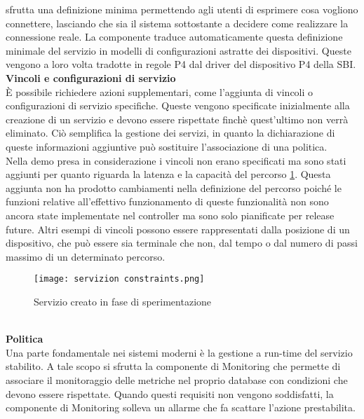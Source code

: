 sfrutta una definizione minima permettendo agli utenti di esprimere cosa vogliono connettere, lasciando che sia il sistema sottostante a decidere come realizzare la connessione reale.
La componente traduce automaticamente questa definizione minimale del servizio in modelli di configurazioni astratte dei dispositivi. 
Queste vengono a loro volta tradotte in regole P4 dal driver del dispositivo P4 della SBI.
\\\textbf{Vincoli e configurazioni di servizio}
\\È possibile richiedere azioni supplementari, come l'aggiunta di vincoli o configurazioni di servizio specifiche. 
Queste vengono specificate inizialmente alla creazione di un servizio e devono essere rispettate finchè quest'ultimo non verrà eliminato. 
Ciò semplifica la gestione dei servizi, in quanto la dichiarazione di queste informazioni aggiuntive può sostituire l'associazione di una politica.
\\Nella demo presa in considerazione i vincoli non erano specificati ma sono stati aggiunti per quanto riguarda la latenza e la capacità del percorso \ref{fig:constraints}.
Questa aggiunta non ha prodotto cambiamenti nella definizione del percorso poiché le funzioni relative all'effettivo funzionamento di queste funzionalità non 
sono ancora state implementate nel controller ma sono solo pianificate per release future.
Altri esempi di vincoli possono essere rappresentati dalla posizione di un dispositivo, che può essere sia terminale che non, dal tempo o dal numero di passi massimo di un determinato percorso.
\begin{figure}[h]
    \centering
   \texttt{[image: servizion constraints.png]}
    \caption{Servizio creato in fase di sperimentazione}
    \label{fig:constraints}
\end{figure}
\\\textbf{Politica}
\\Una parte fondamentale nei sistemi moderni è la gestione a run-time del servizio stabilito\cite{demo}.
A tale scopo si sfrutta la componente di Monitoring che permette di associare il monitoraggio delle metriche nel proprio database
con condizioni che devono essere rispettate.
Quando questi requisiti non vengono soddisfatti, la componente di Monitoring solleva un allarme che fa scattare l'azione prestabilita.
